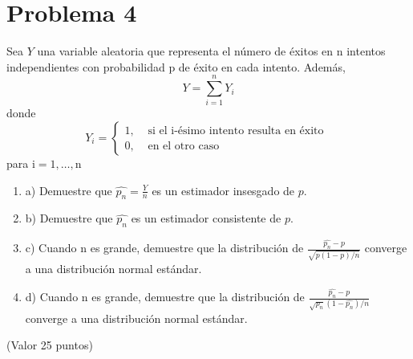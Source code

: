 \section{Problema 4}

Sea $Y$ una variable aleatoria que representa el número de éxitos en $\mathrm{n}$ intentos independientes con probabilidad p de éxito en cada intento. Además,
$$
Y=\sum_{i=1}^{n} Y_{i}
$$
donde
$$
Y_{i}=\begin{cases}
	1  , & \text { si el i-ésimo intento resulta en éxito } \\
	0  , & \text { en el otro caso }
\end{cases}
$$
para $\mathrm{i}=1, \ldots, \mathrm{n}$
\begin{enumerate}
	\item a) Demuestre que $\widehat{p_{n}}=\frac{Y}{n}$ es un estimador insesgado de $p$.
	\item b) Demuestre que $\widehat{p_{n}}$ es un estimador consistente de $p$.
	\item c) Cuando $\mathrm{n}$ es grande, demuestre que la distribución de $\frac{\widehat{p_{n}}-p}{\sqrt{p(1-p) / n}}$ converge a una distribución normal estándar.
	\item d) Cuando $\mathrm{n}$ es grande, demuestre que la distribución de $\frac{\widehat{p_{n}}-p}{\sqrt{p_{n}}\left(1-\widehat{p_{n}}\right) / n}$ converge a una distribución normal estándar. 
\end{enumerate}
(Valor 25 puntos)
